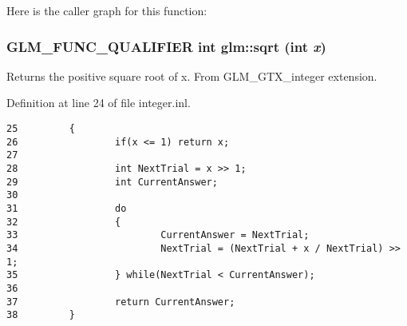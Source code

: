 Here is the caller graph for this function:\hypertarget{group__gtx__integer_g78e2e68330e91d350fcfc2f4831cad12}{
\subsubsection[sqrt]{\setlength{\rightskip}{0pt plus 5cm}GLM\_\-FUNC\_\-QUALIFIER int glm::sqrt (int {\em x})}}
\label{group__gtx__integer_g78e2e68330e91d350fcfc2f4831cad12}


Returns the positive square root of x. From GLM\_\-GTX\_\-integer extension. 

Definition at line 24 of file integer.inl.

\begin{Code}\begin{verbatim}25         {
26                 if(x <= 1) return x;
27 
28                 int NextTrial = x >> 1;
29                 int CurrentAnswer;
30 
31                 do
32                 {
33                         CurrentAnswer = NextTrial;
34                         NextTrial = (NextTrial + x / NextTrial) >> 1;
35                 } while(NextTrial < CurrentAnswer);
36 
37                 return CurrentAnswer;
38         }
\end{verbatim}
\end{Code}


